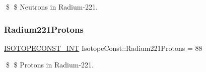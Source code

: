 \$ \$ Neutrons in Radium-\/221. \mbox{\label{group___isotope_const-_radium-_ra221_gae912326244ff0d7907f20fa09c3857f1}} 
\subsubsection{\texorpdfstring{Radium221\+Protons}{Radium221Protons}}
{\footnotesize\ttfamily \mbox{\hyperlink{group___isotope_const-_macros_ga5f18360b3e99483a35c32d789e62621c}{I\+S\+O\+T\+O\+P\+E\+C\+O\+N\+S\+T\+\_\+\+I\+NT}} Isotope\+Const\+::\+Radium221\+Protons = 88}

\$ \$ Protons in Radium-\/221. 